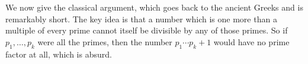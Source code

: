 We now give the classical argument, which goes back to the ancient Greeks and is remarkably short.
The key idea is that a number which is one more than a multiple of every prime cannot itself be divisible by any of those primes.
So if $p_{1}, \ldots, p_{k}$ were all the primes, then the number $p_{1} \cdots p_{k} + 1$ would have no prime factor at all, which is absurd.